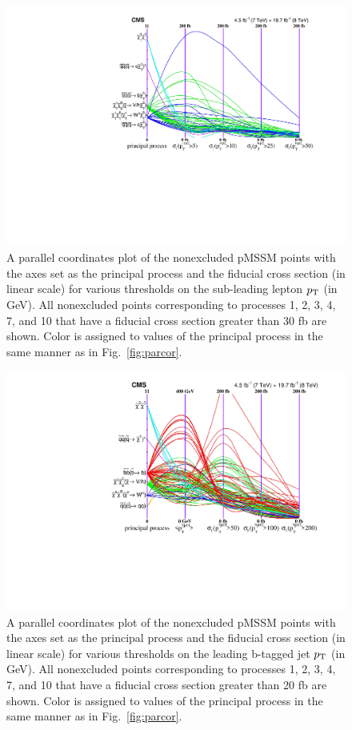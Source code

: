 \begin{figure}[h]
  \centering
   \includegraphics[width=1.0\textwidth]{figures/pMSSMpaper/parallel_coordinates/ParCorToposLep2.pdf}
    \caption{A parallel coordinates plot of the nonexcluded pMSSM
      points with the axes set as the principal process and the 
    fiducial cross section (in linear scale) for various thresholds on the
    sub-leading lepton $p_{\rm T}$ (in GeV). All nonexcluded points corresponding to processes 1, 2, 3,
    4, 7, and 10 that have a fiducial cross section greater than 30 fb are shown. Color is
    assigned to values of the principal process in the same manner as
    in Fig.~\ref{fig:parcor}. } 
    \label{fig:parcorLEP2}
\end{figure}
\begin{figure}[h]
  \centering
   \includegraphics[width=1.0\textwidth]{figures/pMSSMpaper/parallel_coordinates/ParCorToposBjet1.pdf}
    \caption{A parallel coordinates plot of the nonexcluded pMSSM
      points with the axes set as the principal process and the 
    fiducial cross section (in linear scale) for various thresholds on the
    leading b-tagged jet $p_{\rm T}$ (in GeV). All nonexcluded points corresponding to processes 1, 2, 3,
    4, 7, and 10 that have a fiducial cross section greater than 20 fb are shown. Color is
    assigned to values of the principal process in the same manner as
    in Fig.~\ref{fig:parcor}. } 
    \label{fig:parcorBJet1}
\end{figure}

